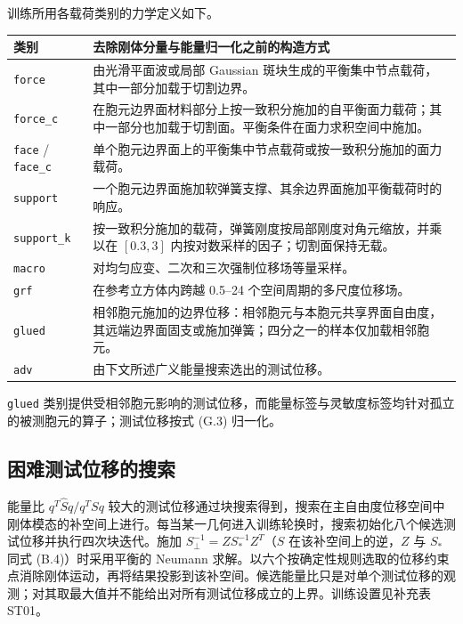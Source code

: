 \documentclass[preprint,12pt,authoryear]{elsarticle}
\def\LTcaptype{table}
\begin{document}
训练所用各载荷类别的力学定义如下。

{\def\LTcaptype{} %
{\small
\begin{longtable}[]{@{}
  >{\raggedright\arraybackslash}p{}
  >{\raggedright\arraybackslash}p{}@{}}
\toprule\noalign{}
\begin{minipage}[b]{\linewidth}\raggedright
类别
\end{minipage} & \begin{minipage}[b]{\linewidth}\raggedright
去除刚体分量与能量归一化之前的构造方式
\end{minipage} \\
\midrule\noalign{}
\endhead
\bottomrule\noalign{}
\endlastfoot
\texttt{force} & 由光滑平面波或局部 Gaussian 斑块生成的平衡集中节点载荷，其中一部分加载于切割边界。 \\
\texttt{force\_c} & 在胞元边界面材料部分上按一致积分施加的自平衡面力载荷；其中一部分也加载于切割面。平衡条件在面力求积空间中施加。 \\
\texttt{face} / \texttt{face\_c} & 单个胞元边界面上的平衡集中节点载荷或按一致积分施加的面力载荷。 \\
\texttt{support} & 一个胞元边界面施加软弹簧支撑、其余边界面施加平衡载荷时的响应。 \\
\texttt{support\_k} & 按一致积分施加的载荷，弹簧刚度按局部刚度对角元缩放，并乘以在 \([0.3,3]\) 内按对数采样的因子；切割面保持无载。 \\
\texttt{macro} & 对均匀应变、二次和三次强制位移场等量采样。 \\
\texttt{grf} & 在参考立方体内跨越 0.5--24 个空间周期的多尺度位移场。 \\
\texttt{glued} & 相邻胞元施加的边界位移：相邻胞元与本胞元共享界面自由度，其远端边界面固支或施加弹簧；四分之一的样本仅加载相邻胞元。 \\
\texttt{adv} & 由下文所述广义能量搜索选出的测试位移。 \\
\end{longtable}}
}

\texttt{glued} 类别提供受相邻胞元影响的测试位移，而能量标签与灵敏度标签均针对孤立的被测胞元的算子；测试位移按式 (G.3) 归一化。

\subsection{困难测试位移的搜索}

能量比 \(q^T\widehat Sq/q^TSq\) 较大的测试位移通过块搜索得到，搜索在主自由度位移空间中刚体模态的补空间上进行。每当某一几何进入训练轮换时，搜索初始化八个候选测试位移并执行四次块迭代。施加 \(S^{-1}_{\perp}=ZS_*^{-1}Z^T\)（\(S\) 在该补空间上的逆，\(Z\) 与 \(S_*\) 同式 (B.4)）时采用平衡的 Neumann 求解。以六个按确定性规则选取的位移约束点消除刚体运动，再将结果投影到该补空间。候选能量比只是对单个测试位移的观测；对其取最大值并不能给出对所有测试位移成立的上界。训练设置见补充表 ST01。
\end{document}
